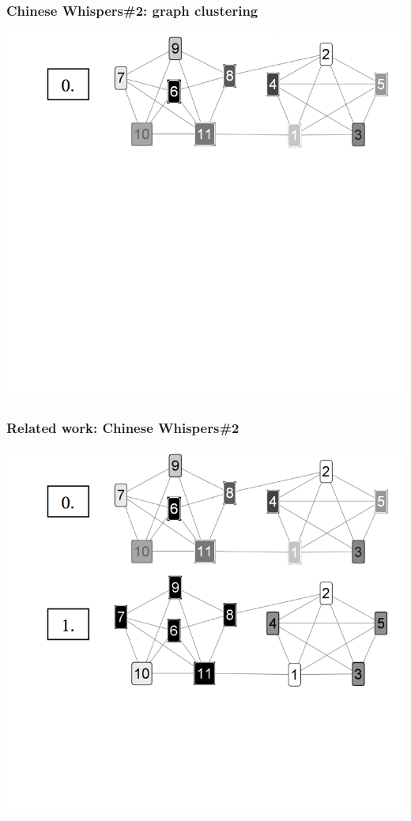 \documentclass[usenames,dvipsnames]{beamer}
\begin{document}
\begin{frame}[fragile]
\frametitle{Chinese Whispers\#2: graph clustering}
\begin{center}
 \includegraphics[height=0.59\textwidth]{figures/cw2-1}
 
 \end{center}
\end{frame}


\begin{frame}[fragile]
\frametitle{Related work: Chinese Whispers\#2}
\begin{center}
 \includegraphics[height=0.59\textwidth]{figures/cw2-2}
 
 \end{center}
\end{frame}
\end{document}
